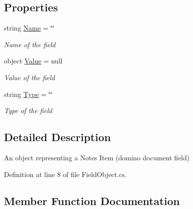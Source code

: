 \subsection*{Properties}
\begin{DoxyCompactItemize}
\item 
string \mbox{\hyperlink{class_field_object_ae5d972e96a3eca93407da8e8a89abfd1}{Name}} = \char`\"{}\char`\"{}
\begin{DoxyCompactList}\small\item\em Name of the field \end{DoxyCompactList}\item 
object \mbox{\hyperlink{class_field_object_a9764fb1824cec95b82cd6ac0b4cd8919}{Value}} = null
\begin{DoxyCompactList}\small\item\em Value of the field \end{DoxyCompactList}\item 
string \mbox{\hyperlink{class_field_object_a370af2c26ae9c3e713b5d88b62a2a8f9}{Type}} = \char`\"{}\char`\"{}
\begin{DoxyCompactList}\small\item\em Type of the field \end{DoxyCompactList}\end{DoxyCompactItemize}


\subsection{Detailed Description}
An object representing a Notes Item (domino document field) 



Definition at line 8 of file Field\+Object.\+cs.



\subsection{Member Function Documentation}
\mbox{\label{class_field_object_a65571e8154ad1333252cb9a8ab5f2c45}} 
